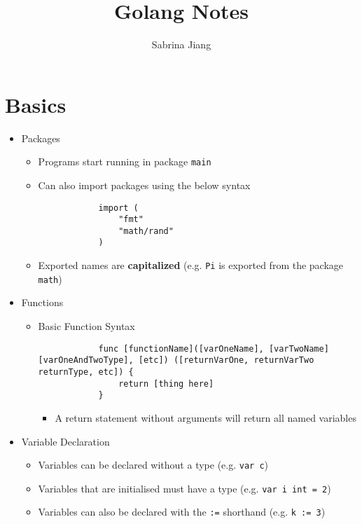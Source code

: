 \documentclass[11pt, oneside]{article}   	%
\title{Golang Notes}
\author{Sabrina Jiang}
\begin{document}
\maketitle
\tableofcontents

\newpage

\section{Basics}
  \begin{itemize}
    \item Packages
      \begin{itemize}
        \item Programs start running in package \texttt{main}
        \item Can also import packages using the below syntax
          \begin{verbatim}
            import (
                "fmt"
                "math/rand"
            )
          \end{verbatim}
        \item Exported names are \textbf{capitalized} (e.g. \texttt{Pi} is exported from the package \texttt{math})
      \end{itemize}
    \item Functions
      \begin{itemize}
        \item Basic Function Syntax
          \begin{verbatim}
            func [functionName]([varOneName], [varTwoName] [varOneAndTwoType], [etc]) ([returnVarOne, returnVarTwo returnType, etc]) {
                return [thing here]
            }
          \end{verbatim}
          \begin{itemize}
            \item A return statement without arguments will return all named variables
          \end{itemize}
      \end{itemize}
    \item Variable Declaration
      \begin{itemize}
        \item Variables can be declared without a type (e.g. \texttt{var c})
        \item Variables that are initialised must have a type (e.g. \texttt{var i int = 2})
        \item Variables can also be declared with the \texttt{:=} shorthand (e.g. \texttt{k := 3})

\end{itemize}
\end{itemize}
\end{document}
